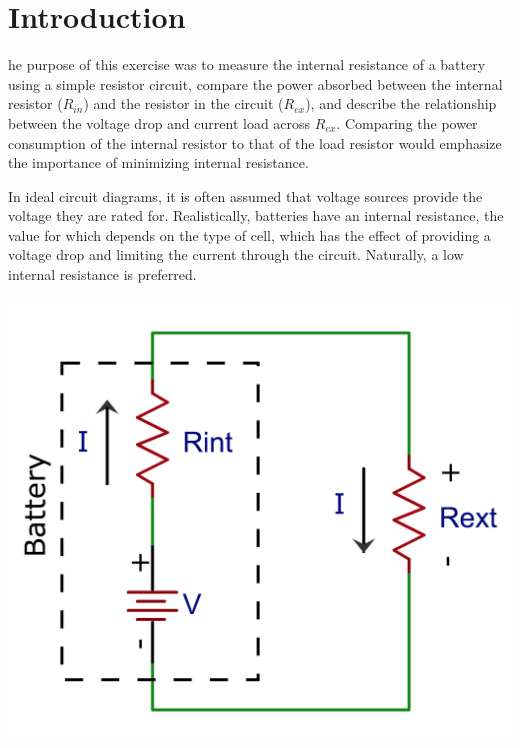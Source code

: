 \documentclass[journal]{IEEEtran}
\begin{document}




\section{Introduction}
\lowercase{he} purpose of this exercise was to measure the internal resistance of a battery using a simple resistor circuit, compare the power absorbed between the internal resistor ($R_{in}$) and the resistor in the circuit ($R_{ex}$), and describe the relationship between the voltage drop and current load across $R_{ex}$. Comparing the power consumption of the internal resistor to that of the load resistor would emphasize the importance of minimizing internal resistance. 

\nonindent In ideal circuit diagrams, it is often assumed that voltage sources provide the voltage they are rated for. Realistically, batteries have an internal resistance, the value for which depends on the type of cell, which has the effect of providing a voltage drop and limiting the current through the circuit. Naturally, a low internal resistance is preferred.

\begingroup
    \medskip
    \centering
    \includegraphics[width=\columnwidth]{images/lab3_1.png}
    \label{fig:first}
    \medskip
\endgroup
\end{document}
